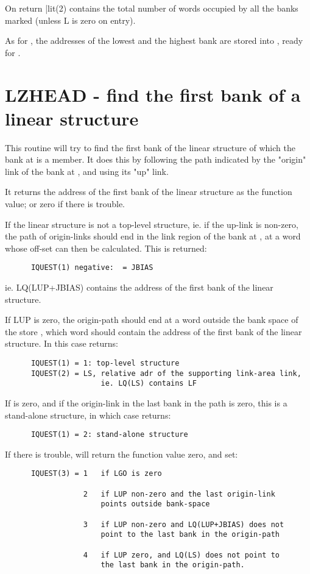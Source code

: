 On return |lit{\IQUEST(2)} contains the total number of words
occupied by all the banks marked (unless L is zero on entry).

As for , the addresses of the lowest and the highest
bank are stored into , ready for .

\section{LZHEAD - find the first bank of a linear structure}

This routine will try to find the first bank of the linear
structure of which the bank at  is a member.
It does this by following the path indicated by the "origin"
link of the bank at , and using its "up" link.




It returns the address of the first bank of the linear structure
as the function value; or zero if there is trouble.

If the linear structure is not a top-level structure,
ie. if the up-link  is non-zero, the path of origin-links should
end in the link region of the bank at , at a word whose
off-set  can then be calculated. This is returned:
\begin{verbatim}
      IQUEST(1) negative:  = JBIAS
\end{verbatim}
ie. LQ(LUP+JBIAS) contains the address of the first bank of the
linear structure.

If LUP is zero, the origin-path should end at a word outside
the bank space of the store , which word
should contain the address of the first bank of the linear structure.
In this case  returns:
\begin{verbatim}
      IQUEST(1) = 1: top-level structure
      IQUEST(2) = LS, relative adr of the supporting link-area link,
                      ie. LQ(LS) contains LF
\end{verbatim}

If  is zero, and if the origin-link in the last bank in the path
is zero, this is a stand-alone structure, in which case  returns:
\begin{verbatim}
      IQUEST(1) = 2: stand-alone structure
\end{verbatim}

If there is trouble,  will return the function value zero,
and set:
\begin{verbatim}
      IQUEST(3) = 1   if LGO is zero

                  2   if LUP non-zero and the last origin-link
                      points outside bank-space

                  3   if LUP non-zero and LQ(LUP+JBIAS) does not
                      point to the last bank in the origin-path

                  4   if LUP zero, and LQ(LS) does not point to
                      the last bank in the origin-path.
\end{verbatim}

